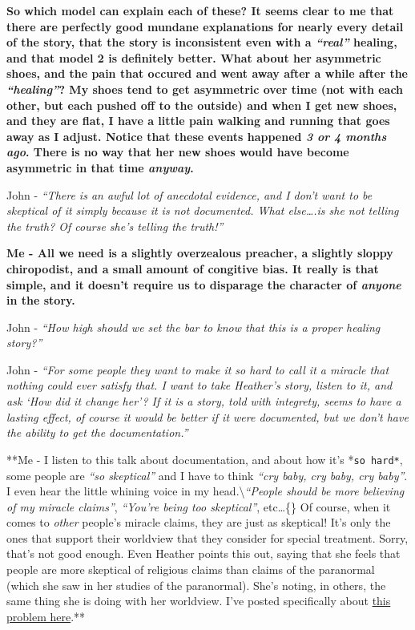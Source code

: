 \documentclass{tufte-book}
\begin{document}
\textbf{So which model can explain each of these? It seems clear to me
that there are perfectly good mundane explanations for nearly every
detail of the story, that the story is inconsistent even with a
\emph{``real''} healing, and that model 2 is definitely better. What
about her asymmetric shoes, and the pain that occured and went away
after a while after the \emph{``healing''}? My shoes tend to get
asymmetric over time (not with each other, but each pushed off to the
outside) and when I get new shoes, and they are flat, I have a little
pain walking and running that goes away as I adjust. Notice that these
events happened \emph{3 or 4 months ago}. There is no way that her new
shoes would have become asymmetric in that time \emph{anyway}.\\}

John - \emph{``There is an awful lot of anecdotal evidence, and I don't
want to be skeptical of it simply because it is not documented. What
else\ldots{}.is she not telling the truth? Of course she's telling the
truth!''}

\textbf{Me - All we need is a slightly overzealous preacher, a slightly
sloppy chiropodist, and a small amount of congitive bias. It really is
that simple, and it doesn't require us to disparage the character of
\emph{anyone} in the story.}

John - \emph{``How high should we set the bar to know that this is a
proper healing story?''}

John - \emph{``For some people they want to make it so hard to call it a
miracle that nothing could ever satisfy that. I want to take Heather's
story, listen to it, and ask `How did it change her'? If it is a story,
told with integrety, seems to have a lasting effect, of course it would
be better if it were documented, but we don't have the ability to get
the documentation.''}

**Me - I listen to this talk about documentation, and about how it's
*\texttt{so\ hard*}, some people are \emph{``so skeptical''} and I have
to think \emph{``cry baby, cry baby, cry baby''}. I even hear the little
whining voice in my
head.\textbackslash{}\emph{``People should be more believing of my
miracle claims''}, \emph{``You're being too skeptical''}, etc\ldots\{\}
Of course, when it comes to \emph{other} people's miracle claims, they
are just as skeptical! It's only the ones that support their worldview
that they consider for special treatment. Sorry, that's not good enough.
Even Heather points this out, saying that she feels that people are more
skeptical of religious claims than claims of the paranormal (which she
saw in her studies of the paranormal). She's noting, in others, the same
thing she is doing with her worldview. I've posted specifically about
\href{https://brianblais.wordpress.com/2012/09/25/naturalistic-bias-presupposing-naturalism/}{this
problem here}.**
\end{document}
